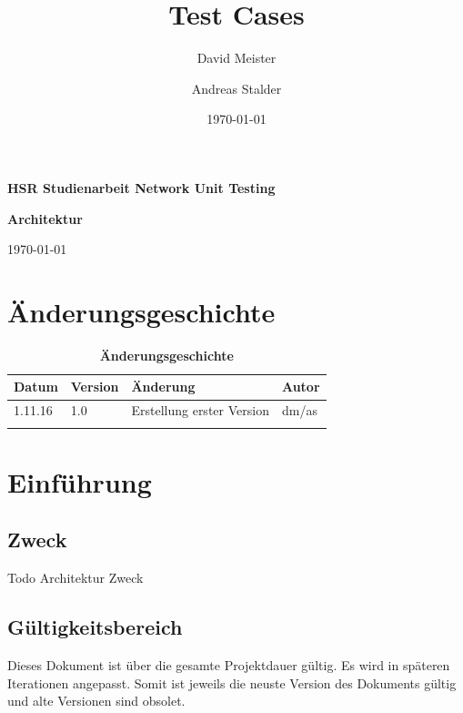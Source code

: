 \documentclass[a4,12pt]{scrartcl}
\title{Test Cases}
\author{David Meister \and Andreas Stalder}
\date{\today}
\begin{document}
\begin{titlepage}
	\centering
	\vspace{5cm}
	\begin{center}
	\end{center}
	\vspace{8cm}
	\raggedright
	{\bfseries HSR Studienarbeit Network Unit Testing\par}
	{\huge\bfseries Architektur \par}
	\vspace{1cm}
	{\theauthor \par}
	{\today\par}

\end{titlepage}

\section{Änderungsgeschichte}

\begin{table}[htb]
\centering
    \begin{tabular}{@{} l l l l@{}}\toprule    
    {Datum} & {Version} & {Änderung} & {Autor}\\ \midrule
    1.11.16 & 1.0 & Erstellung erster Version & dm/as\\ \addlinespace
    \end{tabular}
\caption{\textbf{Änderungsgeschichte}}
\end{table}

\newpage

\tableofcontents
\newpage


\section{Einführung}
\subsection{Zweck}
Todo Architektur Zweck
\subsection{Gültigkeitsbereich}
Dieses Dokument ist über die gesamte Projektdauer gültig. Es wird in späteren Iterationen angepasst. Somit ist jeweils die neuste Version des Dokuments gültig und alte Versionen sind obsolet.
\end{document}
